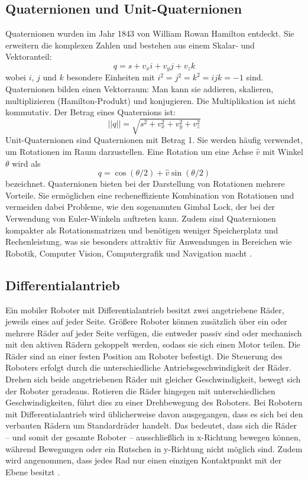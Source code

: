 \subsection{Quaternionen und Unit-Quaternionen}
Quaternionen wurden im Jahr 1843 von William Rowan Hamilton entdeckt. Sie erweitern die komplexen Zahlen und bestehen aus einem Skalar- und Vektoranteil:
 \[
 q=s+v_xi+v_yj+v_zk
 \]
 wobei $i$, $j$ und $k$ besondere Einheiten mit $i^2=j^2=k^2=ijk=-1$ sind.
 Quaternionen bilden einen Vektorraum: Man kann sie addieren, skalieren, multiplizieren (Hamilton-Produkt) und konjugieren. Die Multiplikation ist nicht kommutativ. Der Betrag eines Quaternions ist:
 \[
 ||q||=\sqrt{s^2+v_x^2+v_y^2+v_z^2}
 \]
 Unit-Quaternionen sind Quaternionen mit Betrag 1. Sie werden häufig verwendet, um Rotationen im Raum darzustellen. Eine Rotation um eine Achse $\hat{v}$ mit Winkel $\theta$ wird als
 \[
 q=\cos(\theta/2)+\hat{v} \sin(\theta/2)
 \]
bezeichnet. Quaternionen bieten bei der Darstellung von Rotationen mehrere Vorteile.
 Sie ermöglichen eine recheneffiziente Kombination von Rotationen und vermeiden dabei Probleme, wie den sogenannten Gimbal Lock, der bei der Verwendung von Euler-Winkeln auftreten kann.
 Zudem sind Quaternionen kompakter als Rotationsmatrizen und benötigen weniger Speicherplatz und Rechenleistung,
 was sie besonders attraktiv für Anwendungen in Bereichen wie Robotik, Computer Vision, Computergrafik und Navigation macht .

\subsection{Differentialantrieb}
Ein mobiler Roboter mit Differentialantrieb besitzt zwei angetriebene Räder, jeweils eines auf jeder Seite.
Größere Roboter können zusätzlich über ein oder mehrere Räder auf jeder Seite verfügen, die entweder passiv sind oder mechanisch mit den aktiven Rädern gekoppelt werden,
sodass sie sich einen Motor teilen. Die Räder sind an einer festen Position am Roboter befestigt.
Die Steuerung des Roboters erfolgt durch die unterschiedliche Antriebsgeschwindigkeit der Räder.
Drehen sich beide angetriebenen Räder mit gleicher Geschwindigkeit, bewegt sich der Roboter geradeaus.
Rotieren die Räder hingegen mit unterschiedlichen Geschwindigkeiten, führt dies zu einer Drehbewegung des Roboters.
Bei Robotern mit Differentialantrieb wird üblicherweise davon ausgegangen, dass es sich bei den verbauten Rädern um Standardräder handelt.
Das bedeutet, dass sich die Räder – und somit der gesamte Roboter – ausschließlich in x-Richtung bewegen können, während Bewegungen oder ein Rutschen in y-Richtung nicht möglich sind.
Zudem wird angenommen, dass jedes Rad nur einen einzigen Kontaktpunkt mit der Ebene besitzt
.



